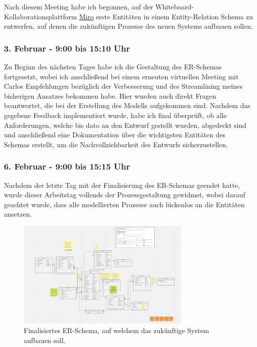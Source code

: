 Nach diesem Meeting habe ich begonnen, auf der Whiteboard-Kollaborationsplattform \href{https://miro.com/de/}{Miro} erste Entitäten in einem Entity-Relation Schema zu entwerfen, auf denen die zukünftigen Prozesse des neuen Systems aufbauen sollen.

\subsubsection*{3. Februar - 9:00 bis 15:10 Uhr}
Zu Beginn des nächsten Tages habe ich die Gestaltung des ER-Schemas fortgesetzt, wobei ich anschließend bei einem erneuten virtuellen Meeting mit Carlos Empfehlungen bezüglich der Verbesserung und des Streamlining meines bisherigen Ansatzes bekommen habe. Hier wurden auch direkt Fragen beantwortet, die bei der Erstellung des Modells aufgekommen sind. Nachdem das gegebene Feedback implementiert wurde, habe ich final überprüft, ob alle Anforderungen, welche bis dato an den Entwurf gestellt wurden, abgedeckt sind und anschließend eine Dokumentation über die wichtigsten Entitäten des Schemas erstellt, um die Nachvollziehbarkeit des Entwurfs sicherzustellen. 

\subsubsection*{6. Februar - 9:00 bis 15:15 Uhr}
Nachdem der letzte Tag mit der Finalisierung des ER-Schemas geendet hatte, wurde dieser Arbeitstag vollends der Prozessgestaltung gewidmet, wobei darauf geachtet wurde, dass alle modellierten Prozesse auch lückenlos an die Entitäten ansetzen. 

\begin{figure}[h]
    \centering
    \includegraphics[width=0.75\textwidth]{img/miro_erschema.png}
    \caption{Finalisiertes ER-Schema, auf welchem das zukünftige System aufbauen soll.}
\end{figure}

